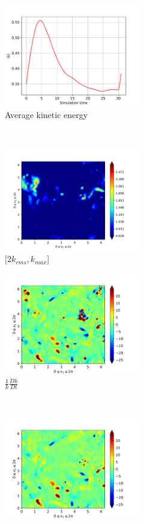 \begin{figure}[H]
    \begin{subfigure}[H]{0.45\textwidth}
        \includegraphics[height=1.75in]{media/run-cds-65/ke-average1400}
        \caption{Average kinetic energy}
    \end{subfigure}
    ~
    \begin{subfigure}[H]{0.45\textwidth}
        \includegraphics[height=1.75in]{media/run-cds-65/ke-2-1400}
        \caption{$[2k_{rms}, k_{max} $] }
    \end{subfigure}
    \newline
    \begin{subfigure}[H]{0.45\textwidth}
        \includegraphics[height=1.75in]{media/run-cds-65/ke-1400}
        \caption{$\frac{1}{k} \frac{D k}{Dt}$}
    \end{subfigure}
    ~
    \begin{subfigure}{0.45\textwidth}
        \includegraphics[height=1.75in]{media/run-cds-65/A-ke-1400}

\end{subfigure}
\end{figure}
